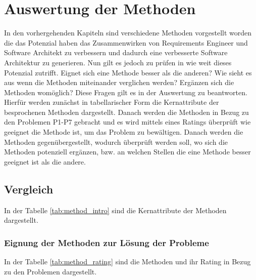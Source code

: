 \section{Auswertung der Methoden}\label{auswertung}
In den vorhergehenden Kapiteln sind verschiedene Methoden vorgestellt worden die das Potenzial haben das Zusammenwirken von Requirements Engineer und Software Architekt zu verbessern und dadurch eine verbesserte Software Architektur zu generieren. Nun gilt es jedoch zu pr\"ufen in wie weit dieses Potenzial zutrifft. Eignet sich eine Methode besser als die anderen? Wie sieht es aus wenn die Methoden miteinander verglichen werden? Erg\"anzen sich die Methoden wom\"oglich? Diese Fragen gilt es in der Auswertung zu beantworten.\\

Hierf\"ur werden zun\"achst in tabellarischer Form die Kernattribute der besprochenen Methoden dargestellt. Danach werden die Methoden in Bezug zu den Problemen P1-P7 gebracht und es wird mittels eines Ratings \"uberpr\"uft wie geeignet die Methode ist, um das Problem zu bew\"altigen. Danach werden die Methoden gegen\"ubergestellt, wodurch \"uberpr\"uft werden soll, wo sich die Methoden potenziell erg\"anzen, bzw. an welchen Stellen die eine Methode besser geeignet ist als die andere.\\ 

\subsection{Vergleich}
In der Tabelle \ref{tab:method_intro} sind die Kernattribute der Methoden dargestellt.\\

\subsubsection{Eignung der Methoden zur L\"osung der Probleme}
In der Tabelle \ref{tab:method_rating} sind die Methoden und ihr Rating in Bezug zu den Problemen dargestellt.\\

